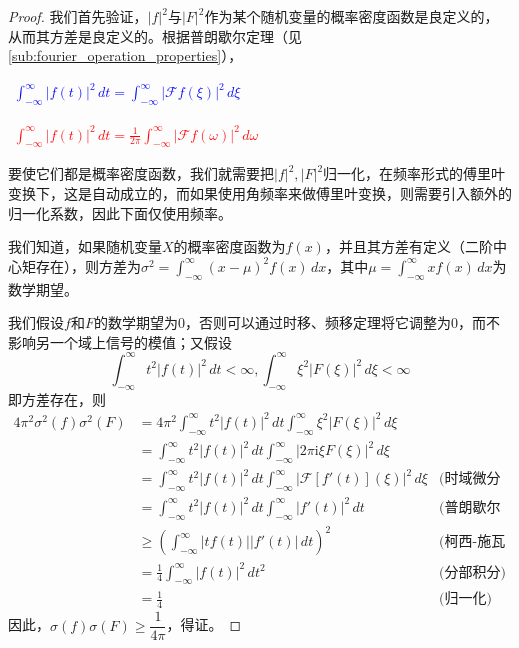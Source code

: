\documentclass{ctexbook}
\newcommand{\lr}[2]{%
    \begin{center}
    \begin{minipage}[t]{0.45\textwidth}
        \centering
        \allowdisplaybreaks
        \textcolor{blue}{%
            \begin{varwidth}{\linewidth}
            $\begin{aligned}
            #1
            \end{aligned}$
            \end{varwidth}
        }
    \end{minipage}
    \hfill
    \begin{minipage}[t]{0.45\textwidth}
        \centering
        \allowdisplaybreaks
        \textcolor{red}{%
            \begin{varwidth}{\linewidth}
            $\begin{aligned}
            #2
            \end{aligned}$
            \end{varwidth}
        }
    \end{minipage}
\end{center}
}
\begin{document}
\begin{proof}
    我们首先验证，$|f|^2$与$|F|^2$作为某个随机变量的概率密度函数是良定义的，从而其方差是良定义的。根据普朗歇尔定理（见\ref{sub:fourier_operation_properties}），\lr{
    \int_{-\infty}^{\infty}|f(t)|^2\,dt=\int_{-\infty}^{\infty}|\mathcal{F} f(\xi)|^2\,d\xi
}{
    \int_{-\infty}^{\infty}|f(t)|^2\,dt=\frac{1}{2\pi}\int_{-\infty}^{\infty}|\mathcal{F} f(\omega)|^2\,d\omega
}
    要使它们都是概率密度函数，我们就需要把$|f|^2,|F|^2$归一化，在频率形式的傅里叶变换下，这是自动成立的，而如果使用角频率来做傅里叶变换，则需要引入额外的归一化系数，因此下面仅使用频率。

    我们知道，如果随机变量$X$的概率密度函数为$f(x)$，并且其方差有定义（二阶中心矩存在），则方差为$\sigma^2=\int_{-\infty}^{\infty}(x-\mu)^2 f(x)\,dx$，其中$\mu=\int_{-\infty}^{\infty}x f(x)\,dx$为数学期望。
    
    我们假设$f$和$F$的数学期望为0，否则可以通过时移、频移定理将它调整为0，而不影响另一个域上信号的模值；又假设\[\int_{-\infty}^{\infty}t^2|f(t)|^2\,dt<\infty,\int_{-\infty}^{\infty}\xi^2|F(\xi)|^2\,d\xi<\infty\]
    即方差存在，则\begin{align*}
    4\pi^2 \sigma^2(f)\sigma^2(F)&=4\pi^2 \int_{-\infty}^{\infty}t^2|f(t)|^2\,dt\int_{-\infty}^{\infty}\xi^2|F(\xi)|^2\,d\xi\\
    &=\int_{-\infty}^{\infty}t^2|f(t)|^2\,dt\int_{-\infty}^{\infty}|2\pi \mathrm{i}\xi F(\xi)|^2\,d\xi\\
    &=\int_{-\infty}^{\infty}t^2|f(t)|^2\,dt\int_{-\infty}^{\infty}\left| \mathcal{F} [f'(t)](\xi)\right|^2\,d\xi&\text{(时域微分性质)}\\
    &=\int_{-\infty}^{\infty}t^2|f(t)|^2\,dt\int_{-\infty}^{\infty}| f'(t)|^2\,dt&\text{(普朗歇尔定理)}\\
    &\geq \left(\int_{-\infty}^{\infty}|tf(t)||f'(t)|\,dt\right)^2&\text{(柯西-施瓦兹不等式)}\\
    &=\frac{1}{4}\int_{-\infty}^{\infty}|f(t)|^2\,dt^2&\text{(分部积分)}\\
    &=\frac{1}{4}&\text{(归一化)}
    \end{align*}
    因此，$\sigma(f)\sigma(F)\geq \dfrac{1}{4\pi}$，得证。
\end{proof}
\end{document}

